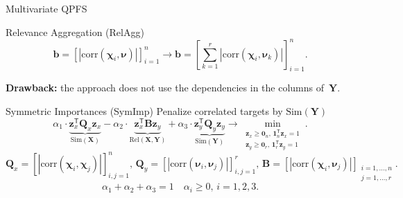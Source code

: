 \documentclass[9pt]{beamer}
\newcommand{\bz}{\mathbf{z}}
\newcommand{\bb}{\mathbf{b}}
\newcommand{\bY}{\mathbf{Y}}
\newcommand{\bX}{\mathbf{X}}
\newcommand{\bB}{\mathbf{B}}
\newcommand{\bQ}{\mathbf{Q}}
\newcommand{\bchi}{\boldsymbol{\chi}}
\newcommand{\bnu}{\boldsymbol{\nu}}
\newcommand{\bOne}{\boldsymbol{1}}
\newcommand{\bZero}{\boldsymbol{0}}
\newcommand{\T}{\mathsf{T}}
\begin{document}
\begin{frame}{Multivariate QPFS}
\begin{block}{Relevance Aggregation (RelAgg)}
	\[
	\bb = \left[\left|\text{corr}(\bchi_i, \bnu)\right|\right]_{i=1}^n \rightarrow \bb = \left[\sum_{k=1}^r\left|\text{corr}(\bchi_i, \bnu_k)\right|\right]_{i=1}^n.
	\]
\end{block}
{\bf Drawback:} the approach does not use the dependencies in the columns of~$\bY$. 

\begin{block}{Symmetric Importances (SymImp)}
	Penalize correlated targets by $\text{Sim} (\bY)$
	\[
	\alpha_1 \cdot \underbrace{\bz_x^{\T} \bQ_x \bz_x}_{\text{Sim}(\bX)} - \alpha_2 \cdot \underbrace{\bz_x^{\T} \bB \bz_y}_{\text{Rel}(\bX, \bY)} + \alpha_3 \cdot \underbrace{\bz_y^{\T} \bQ_y \bz_y}_{\text{Sim}(\bY)} \rightarrow \min_{\substack{\bz_x \geq \bZero_n, \, \bOne_n^{\T}\bz_x=1 \\ \bz_y \geq \bZero_r, \, \bOne_r^{\T}\bz_y=1}}.
	\]
	\[
	\bQ_x = \left[ \left| \text{corr}(\bchi_i, \bchi_j) \right| \right]_{i,j=1}^n, \,
	\bQ_y = \left[ \left| \text{corr}(\bnu_i, \bnu_j) \right| \right]_{i,j=1}^r, \,
	\bB =  \left[ \left| \text{corr}(\bchi_i, \bnu_j) \right| \right]_{\substack{i=1, \dots, n \\ j=1, \dots, r}}.
	\]
	\[
	\alpha_1 + \alpha_2 + \alpha_3 = 1 \quad \alpha_i \geq 0, \, i = 1, 2, 3.
	\] 
\end{block}
\end{frame}
\end{document}

